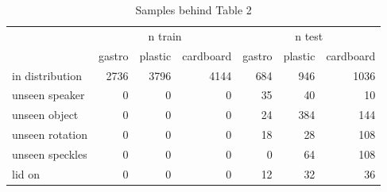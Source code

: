 \begin{table}
\caption{Samples behind Table 2}
\label{tab:ood_samples}
\begin{tabular}{lrrrrrr}
\toprule
 & \multicolumn{3}{c}{n train} & \multicolumn{3}{c}{n test} \\
 & gastro & plastic & cardboard & gastro & plastic & cardboard \\
\midrule
in distribution & 2736 & 3796 & 4144 & 684 & 946 & 1036 \\
unseen speaker & 0 & 0 & 0 & 35 & 40 & 10 \\
unseen object & 0 & 0 & 0 & 24 & 384 & 144 \\
unseen rotation & 0 & 0 & 0 & 18 & 28 & 108 \\
unseen speckles & 0 & 0 & 0 & 0 & 64 & 108 \\
lid on & 0 & 0 & 0 & 12 & 32 & 36 \\
\bottomrule
\end{tabular}
\end{table}
